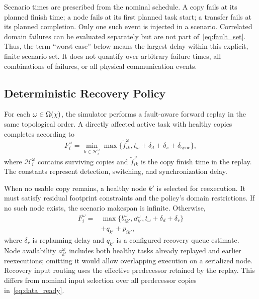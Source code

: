 Scenario times are prescribed from the nominal schedule. A copy fails at its
planned finish time; a node fails at its first planned task start; a transfer
fails at its planned completion. Only one such event is injected in a
scenario. Correlated domain failures can be evaluated separately but are not
part of~\eqref{eq:fault_set}. Thus, the term ``worst case'' below means the
largest delay within this explicit, finite scenario set. It does not quantify
over arbitrary failure times, all combinations of failures, or all physical
communication events.

\subsection{Deterministic Recovery Policy}
For each $\omega\in\Omega(\chi)$, the simulator performs a fault-aware forward
replay in the same topological order. A directly affected active task with
healthy copies completes according to
\begin{equation}
 F_i^{\omega}=\min_{k\in\mathcal H_i^{\omega}}
 \max\{\widetilde f_{ik}^{\omega},
       t_{\omega}+\delta_d+\delta_s+\delta_{\mathrm{sync}}\},
 \label{eq:active_recovery}
\end{equation}
where $\mathcal H_i^{\omega}$ contains surviving copies and
$\widetilde f_{ik}^{\omega}$ is the copy finish time in the replay.
The constants represent detection, switching, and synchronization delay.

When no usable copy remains, a healthy node $k'$ is selected for reexecution.
It must satisfy residual footprint constraints and the policy's domain
restrictions. If no such node exists, the scenario makespan is infinite.
Otherwise,
\begin{equation}
\begin{split}
 F_i^{\omega}={}&\max\{b_{ik'}^{\omega},a_{k'}^{\omega},
                 t_{\omega}+\delta_d+\delta_r\}\\
               &+q_{k'}+p_{ik'},
\end{split}
\label{eq:passive_recovery}
\end{equation}
where $\delta_r$ is replanning delay and $q_{k'}$ is a configured recovery
queue estimate. Node availability $a_{k'}^{\omega}$ includes both healthy
tasks already replayed and earlier reexecutions; omitting it would allow
overlapping execution on a serialized node. Recovery input routing uses the
effective predecessor retained by the replay. This differs from nominal
input selection over all predecessor copies in~\eqref{eq:data_ready}.

